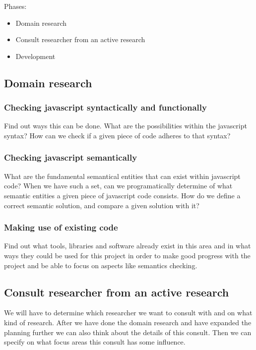 \documentclass{article}
\begin{document}
Phases:
\begin{itemize}
  \item Domain research\\
  \item Consult researcher from an active research\\
  \item Development\\
\end{itemize}


\subsection{Domain research}

\subsubsection{Checking javascript syntactically and functionally}
Find out ways this can be done. What are the possibilities within the javascript syntax? How can we check if a given piece of code adheres to that syntax?
\subsubsection{Checking javascript semantically}
What are the fundamental semantical entities that can exist within javascript code? When we have such a set, can we programatically determine of what semantic entities a given piece of javascript code consists. How do we define a correct semantic solution, and compare a given solution with it?
\subsubsection{Making use of existing code}
Find out what tools, libraries and software already exist in this area and in what ways they could be used for this project in order to make good progress with the project and be able to focus on aspects like semantics checking.

\subsection{Consult researcher from an active research}
We will have to determine which researcher we want to consult with and on what kind of research. After we have done the domain research and have expanded the planning further we can also think about the details of this consult. Then we can specify on what focus areas this consult has some influence.\\
\end{document}
